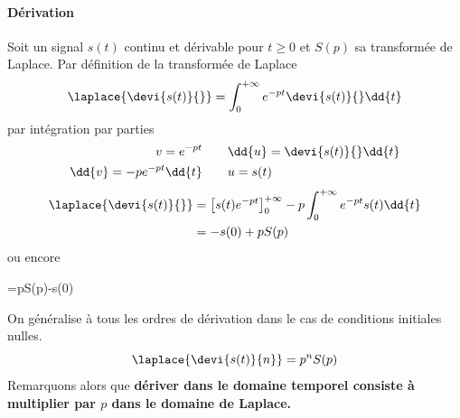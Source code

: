 \paragraph{Dérivation}
Soit un signal $s(t)$ continu et dérivable pour $t\ge0$ et $S(p)$ 
sa transformée de Laplace. Par définition de la transformée de Laplace 
\[
\laplace{\devi{s(t)}{}}=\int_{0}^{+\infty} e^{-pt}\devi{s(t)}{}\dd{t}
\]
par intégration par parties
\begin{align*}
    v=e^{-pt}\qquad&\dd{u}=\devi{s(t)}{}\dd{t}\\
    \dd{v}=-pe^{-pt}\dd{t}\qquad&u=s(t)
\end{align*}
\begin{align*}
\laplace{\devi{s(t)}{}}&=\left[s(t)e^{-pt}\right]_0
                         ^{+\infty}-p\int_{0}^{+\infty}e^{-pt}s(t)\dd{t}\\
                         &=-s(0)+pS(p)
\end{align*}
ou encore
\begin{bequation}
    =pS(p)-s(0)
\end{bequation}
On généralise à tous les ordres de dérivation dans le cas de conditions 
initiales nulles.
\[
\laplace{\devi{s(t)}{n}}=p^nS(p)
\]
Remarquons alors que \textbf{dériver dans le domaine temporel consiste 
à multiplier par $p$ dans le domaine de Laplace.}
